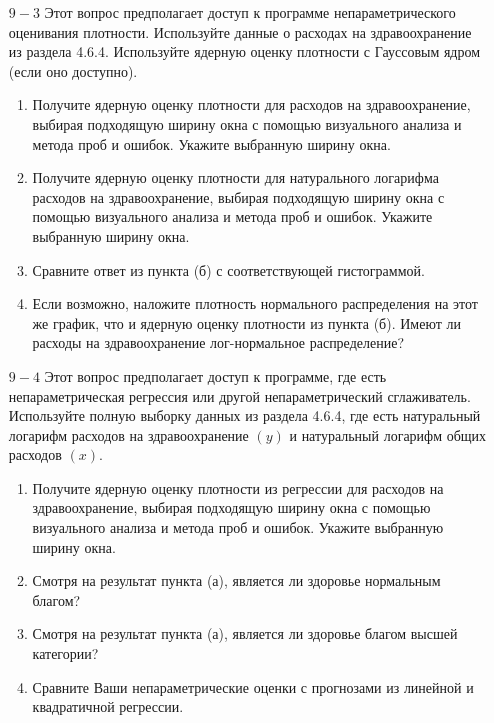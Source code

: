 \begin{enumerate}
\item [$9 - 3$] Этот вопрос предполагает доступ к программе непараметрического оценивания плотности. Используйте данные о расходах на здравоохранение из раздела 4.6.4. Используйте ядерную оценку плотности с Гауссовым ядром (если оно доступно).
\begin{enumerate}
\item Получите ядерную оценку плотности для расходов на здравоохранение, выбирая подходящую ширину окна с помощью визуального анализа и метода проб и ошибок. Укажите выбранную ширину окна.
\item Получите ядерную оценку плотности для натурального логарифма расходов на здравоохранение, выбирая подходящую ширину окна с помощью визуального анализа и метода проб и ошибок. Укажите выбранную ширину окна.
\item Сравните ответ из пункта (б) с соответствующей гистограммой.
\item Если возможно, наложите плотность нормального распределения на этот же график, что и
ядерную оценку плотности из пункта (б). Имеют ли расходы на здравоохранение лог-нормальное распределение?
\end{enumerate}
\item [$9 - 4$] Этот вопрос предполагает доступ к программе, где есть непараметрическая регрессия или другой	 непараметрический сглаживатель. Используйте полную выборку данных из раздела 4.6.4, где есть натуральный логарифм расходов на здравоохранение $(y)$ и натуральный логарифм общих расходов $(x)$.
\begin{enumerate}
\item Получите ядерную оценку плотности из регрессии для расходов на здравоохранение, выбирая подходящую ширину окна с помощью визуального анализа и метода проб и ошибок. Укажите выбранную ширину окна.
\item Смотря на результат пункта (а), является ли здоровье нормальным благом?
\item Смотря на результат пункта (а), является ли здоровье благом высшей категории?
\item Сравните Ваши непараметрические оценки с прогнозами из линейной и квадратичной регрессии.
\end{enumerate}
\end{enumerate}

